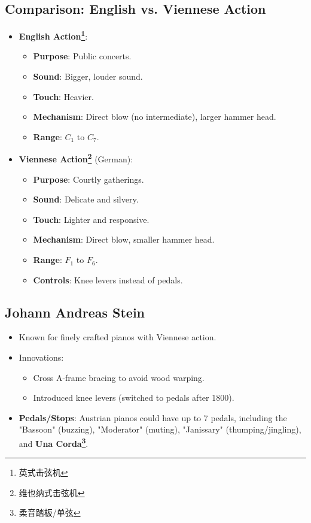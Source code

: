 \documentclass[math,code]{amznotes}
\theoremstyle{remark}
\begin{document}
\subsection{Comparison: English vs. Viennese Action}
\begin{itemize}
    \item \textbf{English Action\footnote{英式击弦机}}:
    \begin{itemize}
        \item \textbf{Purpose}: Public concerts.
        \item \textbf{Sound}: Bigger, louder sound.
        \item \textbf{Touch}: Heavier.
        \item \textbf{Mechanism}: Direct blow (no intermediate), larger hammer head.
        \item \textbf{Range}: $C_1$ to $C_7$.
    \end{itemize}
    \item \textbf{Viennese Action\footnote{维也纳式击弦机}} (German):
    \begin{itemize}
        \item \textbf{Purpose}: Courtly gatherings.
        \item \textbf{Sound}: Delicate and silvery.
        \item \textbf{Touch}: Lighter and responsive.
        \item \textbf{Mechanism}: Direct blow, smaller hammer head.
        \item \textbf{Range}: $F_1$ to $F_6$.
        \item \textbf{Controls}: Knee levers instead of pedals.
    \end{itemize}
\end{itemize}

\subsection{Johann Andreas Stein}
\begin{itemize}
    \item Known for finely crafted pianos with Viennese action.
    \item Innovations:
    \begin{itemize}
        \item Cross A-frame bracing to avoid wood warping.
        \item Introduced knee levers (switched to pedals after 1800).
    \end{itemize}
    \item \textbf{Pedals/Stops}: Austrian pianos could have up to 7 pedals, including the "Bassoon" (buzzing), "Moderator" (muting), "Janissary" (thumping/jingling), and \textbf{Una Corda\footnote{柔音踏板/单弦}}.
\end{itemize}
\end{document}
